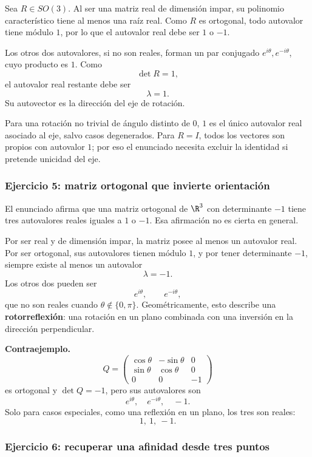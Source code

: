 Sea \(R\in SO(3)\). Al ser una matriz real de dimensión impar, su polinomio característico
tiene al menos una raíz real. Como \(R\) es ortogonal, todo autovalor tiene módulo \(1\), por
lo que el autovalor real debe ser \(1\) o \(-1\).

Los otros dos autovalores, si no son reales, forman un par conjugado
\(e^{i\theta},e^{-i\theta}\), cuyo producto es \(1\). Como
\[
  \det R=1,
\]
el autovalor real restante debe ser
\[
  \boxed{\lambda=1}.
\]
Su autovector es la dirección del eje de rotación.

\begin{atencion}
Para una rotación no trivial de ángulo distinto de \(0\), \(1\) es el único autovalor real
asociado al eje, salvo casos degenerados. Para \(R=I\), todos los vectores son propios con
autovalor \(1\); por eso el enunciado necesita excluir la identidad si pretende unicidad del
eje.
\end{atencion}

\subsubsection{Ejercicio 5: matriz ortogonal que invierte orientación}

El enunciado afirma que una matriz ortogonal de \(\R^3\) con determinante \(-1\) tiene tres
autovalores reales iguales a \(1\) o \(-1\). Esa afirmación no es cierta en general.

Por ser real y de dimensión impar, la matriz posee al menos un autovalor real. Por ser
ortogonal, sus autovalores tienen módulo \(1\), y por tener determinante \(-1\), siempre
existe al menos un autovalor
\[
  \boxed{\lambda=-1}.
\]
Los otros dos pueden ser
\[
  e^{i\theta},\qquad e^{-i\theta},
\]
que no son reales cuando \(\theta\notin\{0,\pi\}\). Geométricamente, esto describe una
\textbf{rotorreflexión}: una rotación en un plano combinada con una inversión en la dirección
perpendicular.

\textbf{Contraejemplo.}
\[
Q=
\begin{pmatrix}
\cos\theta&-\sin\theta&0\\
\sin\theta& \cos\theta&0\\
0&0&-1
\end{pmatrix}
\]
es ortogonal y \(\det Q=-1\), pero sus autovalores son
\[
  e^{i\theta},\quad e^{-i\theta},\quad -1.
\]
Solo para casos especiales, como una reflexión en un plano, los tres son reales:
\[
  1,\ 1,\ -1.
\]

\subsubsection{Ejercicio 6: recuperar una afinidad desde tres puntos}

